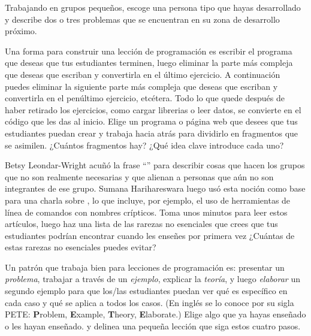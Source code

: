 Trabajando en grupos pequeños,
escoge una persona tipo que hayas desarrollado
y describe dos o tres problemas que se encuentran en su zona de desarrollo próximo.
 
 
Una forma para construir una lección de programación
es escribir el programa que deseas que tus estudiantes terminen,
luego eliminar la parte más compleja que deseas que escriban
y convertirla en el último ejercicio.
A continuación puedes eliminar la siguiente parte más compleja que deseas que escriban
y convertirla en el penúltimo ejercicio, etcétera.
Todo lo que quede después de haber retirado los ejercicios,
como cargar librerias o leer datos,
se convierte en el código que les das al inicio.
 Elige un programa o página web que desees que
tus estudiantes puedan crear
y trabaja hacia atrás para dividirlo en fragmentos que se asimilen.
¿Cuántos fragmentos hay?
¿Qué idea clave introduce cada uno?
 
 
Betsy Leondar-Wright acuñó la frase
``''
para describir cosas que hacen los grupos
que no son realmente necesarias y
que alienan a personas que aún no son integrantes de ese grupo.
Sumana Harihareswara luego usó esta noción
como base para una charla sobre
,
lo que incluye, por ejemplo, el uso de herramientas de línea de comandos con nombres crípticos.
Toma unos minutos para leer estos artículos,
luego haz una lista de las rarezas no esenciales que crees
que tus estudiantes podrían encontrar
cuando les enseñes por primera vez
¿Cuántas de estas rarezas no esenciales puedes evitar?
 

Un patrón que trabaja bien para lecciones de programación es:
presentar un \emph{problema},
trabajar a través de un \emph{ejemplo},
explicar la \emph{teoría},
y luego \emph{elaborar} un segundo ejemplo
para que los/las estudiantes puedan ver qué es específico en cada caso
y qué se aplica a todos los casos. (En inglés se lo conoce por su sigla PETE: 
\textbf{P}roblem, \textbf{E}xample, \textbf{T}heory, \textbf{E}laborate.)
Elige algo que ya hayas enseñado o les hayan enseñado.
y delinea una pequeña lección que siga estos cuatro pasos.

